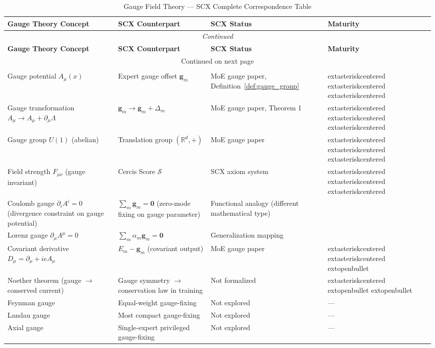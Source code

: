 \documentclass[12pt,a4paper]{article}
\theoremstyle{remark}
\newcommand{\R}{\mathbb{R}}
\newcommand{\CercisScore}{\mathcal{S}}
\newcommand{\gaugeparam}{\mathbf{g}}
\begin{document}
\begin{longtable}{p{4.2cm} p{5cm} p{4cm} p{2cm}}
\caption{Gauge Field Theory — SCX Complete Correspondence Table}
\label{tab:grand}\\
\toprule
\textbf{Gauge Theory Concept} & \textbf{SCX Counterpart} & \textbf{SCX Status} & \textbf{Maturity} \\
\midrule
\endfirsthead
\multicolumn{4}{c}{\textit{Continued}}\\
\toprule
\textbf{Gauge Theory Concept} & \textbf{SCX Counterpart} & \textbf{SCX Status} & \textbf{Maturity} \\
\midrule
\endhead
\midrule
\multicolumn{4}{c}{\small Continued on next page}\\
\endfoot
\bottomrule
\endlastfoot

\midrule
\multicolumn{4}{c}{\textbf{1. Electromagnetic Gauge}} \\
\midrule
Gauge potential $A_\mu(x)$ & Expert gauge offset $\gaugeparam_m$ & MoE gauge paper, Definition~\ref{def:gauge_group} & 	extasteriskcentered	extasteriskcentered	extasteriskcentered \\
Gauge transformation $A_\mu \to A_\mu + \partial_\mu\Lambda$ & $\gaugeparam_m \to \gaugeparam_m + \Delta_m$ & MoE gauge paper, Theorem 1 & 	extasteriskcentered	extasteriskcentered	extasteriskcentered \\
Gauge group $U(1)$ (abelian) & Translation group $(\R^d, +)$ & MoE gauge paper & 	extasteriskcentered	extasteriskcentered	extasteriskcentered \\
Field strength $F_{\mu\nu}$ (gauge invariant) & Cercis Score $\CercisScore$ & SCX axiom system & 	extasteriskcentered	extasteriskcentered	extasteriskcentered \\
Coulomb gauge $\partial_i A^i = 0$ (divergence constraint on gauge potential) & $\sum_m \gaugeparam_m = \mathbf{0}$ (zero-mode fixing on gauge parameter) & Functional analogy (different mathematical type) \\
Lorenz gauge $\partial_\mu A^\mu = 0$ & $\sum_m \alpha_m \gaugeparam_m = \mathbf{0}$ & Generalization mapping \\
Covariant derivative $D_\mu = \partial_\mu + ieA_\mu$ & $E_m - \gaugeparam_m$ (covariant output) & MoE gauge paper & 	extasteriskcentered	extasteriskcentered	extopenbullet \\
Noether theorem (gauge $\to$ conserved current) & Gauge symmetry $\to$ conservation law in training & Not formalized & 	extasteriskcentered	extopenbullet	extopenbullet \\
Feynman gauge & Equal-weight gauge-fixing & Not explored & — \\
Landau gauge & Most compact gauge-fixing & Not explored & — \\
Axial gauge & Single-expert privileged gauge-fixing & Not explored & — \\


\end{longtable}
\end{document}

